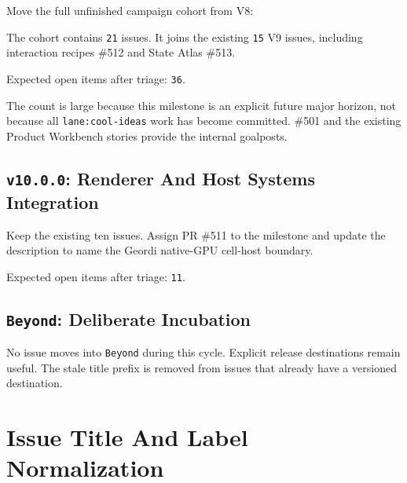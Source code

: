 Move the full unfinished campaign cohort from V8:



The cohort contains \texttt{2\allowbreak{}1} issues. It joins the existing \texttt{1\allowbreak{}5} V9 issues, including interaction recipes \#512 and State Atlas \#513.

Expected open items after triage: \texttt{3\allowbreak{}6}.

The count is large because this milestone is an explicit future major horizon, not because all \texttt{l\allowbreak{}a\allowbreak{}n\allowbreak{}e\allowbreak{}:\allowbreak{}c\allowbreak{}o\allowbreak{}o\allowbreak{}l\allowbreak{}-\allowbreak{}i\allowbreak{}d\allowbreak{}e\allowbreak{}a\allowbreak{}s} work has become committed. \#501 and the existing Product Workbench stories provide the internal goalposts.

\subsection{\texorpdfstring{\texttt{v\allowbreak{}1\allowbreak{}0\allowbreak{}.\allowbreak{}0\allowbreak{}.\allowbreak{}0}: Renderer And Host Systems Integration}{: Renderer And Host Systems Integration}}\label{record-249-v10.0.0-renderer-and-host-systems-integration}

Keep the existing ten issues. Assign PR \#511 to the milestone and update the description to name the Geordi native-GPU cell-host boundary.

Expected open items after triage: \texttt{1\allowbreak{}1}.

\subsection{\texorpdfstring{\texttt{B\allowbreak{}e\allowbreak{}y\allowbreak{}o\allowbreak{}n\allowbreak{}d}: Deliberate Incubation}{: Deliberate Incubation}}\label{record-249-beyond-deliberate-incubation}

No issue moves into \texttt{B\allowbreak{}e\allowbreak{}y\allowbreak{}o\allowbreak{}n\allowbreak{}d} during this cycle. Explicit release destinations remain useful. The stale title prefix is removed from issues that already have a versioned destination.

\section{Issue Title And Label Normalization}\label{record-249-issue-title-and-label-normalization}

